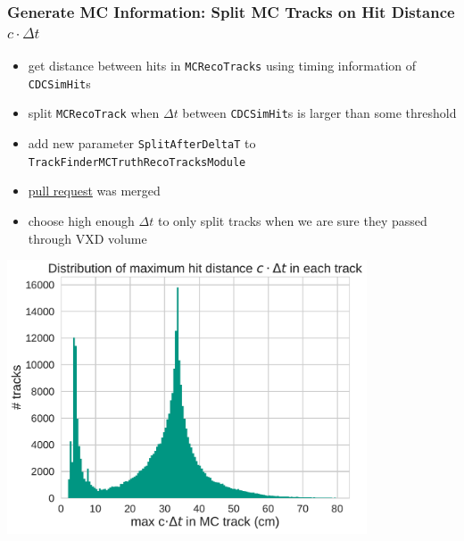 \documentclass[18pt]{beamer}
\begin{document}
\begin{frame}
  \frametitle{Generate MC Information: Split MC Tracks on Hit Distance $c \cdot \Delta t$}
  \begin{itemize}
  \item get distance between hits in \texttt{MCRecoTracks} using timing information of \texttt{CDCSimHit}s
  \item split \texttt{MCRecoTrack} when  $\Delta t$ between \texttt{CDCSimHit}s is larger than some threshold
  \item add new parameter \texttt{SplitAfterDeltaT} to \texttt{TrackFinderMCTruthRecoTracksModule}
  \item \href{https://stash.desy.de/projects/B2/repos/software/pull-requests/737}{pull request} was merged
  \item choose high enough $\Delta t$ to only split tracks when we are sure they passed through VXD volume\\
  \end{itemize}
\end{frame}

\begin{frame}
    \begin{center}
    \includegraphics[width=0.8\textwidth]{figures/delta_t/gcraugust_delta_t_max_linear_xmin=0.pdf}
  \end{center}
\end{frame}
\end{document}
